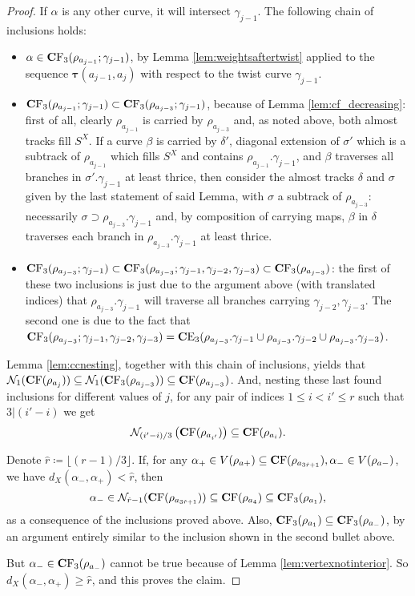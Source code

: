 \begin{proof}
If $\alpha$ is any other curve, it will intersect $\gamma_{j-1}$. The following chain of inclusions holds:
\begin{itemize}
\item $\alpha\in \mathbf C \mathrm F_3(\rho_{a_{j-1}};\gamma_{j-1})$, by Lemma \ref{lem:weightsaftertwist} applied to the sequence $\bm\tau(a_{j-1},a_j)$ with respect to the twist curve $\gamma_{j-1}$.
\item $\mathbf C \mathrm F_3(\rho_{a_{j-1}};\gamma_{j-1})\subset \mathbf C \mathrm F_3(\rho_{a_{j-3}};\gamma_{j-1})$, because of Lemma \ref{lem:cf_decreasing}: first of all, clearly $\rho_{a_{j-1}}$ is carried by $\rho_{a_{j-3}}$ and, as noted above, both almost tracks fill $S^X$. If a curve $\beta$ is carried by $\delta'$, diagonal extension of $\sigma'$ which is a subtrack of $\rho_{a_{j-1}}$ which fills $S^X$ and contains $\rho_{a_{j-1}}.\gamma_{j-1}$, and $\beta$ traverses all branches in $\sigma'.\gamma_{j-1}$ at least thrice, then consider the almost tracks $\delta$ and $\sigma$ given by the last statement of said Lemma, with $\sigma$ a subtrack of $\rho_{a_{j-3}}$: necessarily $\sigma\supset \rho_{a_{j-3}}.\gamma_{j-1}$ and, by composition of carrying maps, $\beta$ in $\delta$ traverses each branch in $\rho_{a_{j-3}}.\gamma_{j-1}$ at least thrice.
\item $\mathbf C \mathrm F_3(\rho_{a_{j-3}};\gamma_{j-1}) \subset\mathbf C \mathrm F_3(\rho_{a_{j-3}};\gamma_{j-1},\gamma_{j-2},\gamma_{j-3})\subset \mathbf C \mathrm F_3(\rho_{a_{j-3}})$: the first of these two inclusions is just due to the argument above (with translated indices) that $\rho_{a_{j-3}}.\gamma_{j-1}$ will traverse all branches carrying $\gamma_{j-2},\gamma_{j-3}$. The second one is due to the fact that $\mathbf C \mathrm F_3(\rho_{a_{j-3}};\gamma_{j-1},\gamma_{j-2},\gamma_{j-3})=\mathbf C \mathrm E_3(\rho_{a_{j-3}}.\gamma_{j-1}\cup \rho_{a_{j-3}}.\gamma_{j-2}\cup \rho_{a_{j-3}}.\gamma_{j-3})$.
\end{itemize}

Lemma \ref{lem:ccnesting}, together with this chain of inclusions, yields that ${\mathcal N}_1(\mathbf C \mathrm F(\rho_{a_j}))\subseteq {\mathcal N}_1(\mathbf C \mathrm F_3(\rho_{a_{j-3}}))\subseteq \mathbf C \mathrm F(\rho_{a_{j-3}})$. And, nesting these last found inclusions for different values of $j$, for any pair of indices $1\leq i<i'\leq r$ such that $3|(i'-i)$ we get
$$
\mathcal N_{(i'-i)/3}\left(\mathbf C \mathrm F(\rho_{a_{i'}})\right)\subseteq \mathbf C \mathrm F(\rho_{a_i}).
$$

Denote $\hat r\coloneqq \lfloor(r-1)/3\rfloor$. If, for any $\alpha_+\in V(\rho_{a+})\subseteq \mathbf C \mathrm F(\rho_{a_{3\hat r+1}}),\alpha_-\in V(\rho_{a-})$, we have $d_X(\alpha_-,\alpha_+)< \hat r$, then
$$\alpha_- \in {\mathcal N}_{\hat r - 1}(\mathbf C \mathrm F(\rho_{a_{3\hat r+1}}))\subseteq \mathbf C \mathrm F(\rho_{a_4}) \subseteq \mathbf C \mathrm F_3(\rho_{a_1}),$$
as a consequence of the inclusions proved above. Also, $\mathbf C \mathrm F_3(\rho_{a_1})\subseteq \mathbf C \mathrm F_3(\rho_{a_-})$, by an argument entirely similar to the inclusion shown in the second bullet above.

But $\alpha_- \in \mathbf C \mathrm F_3(\rho_{a_-})$ cannot be true because of Lemma \ref{lem:vertexnotinterior}. So $d_X(\alpha_-,\alpha_+)\geq \hat r$, and this proves the claim.
\end{proof}

